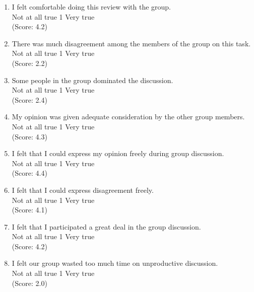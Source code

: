\begin{enumerate}
\item I felt comfortable doing this review with the group.
\\
Not at all true \hfill 1     \hfill Very true\\
(Score: 4.2)

\item There was much disagreement among the members of the group on
this task.
\\
Not at all true \hfill 1     \hfill Very true\\
(Score: 2.2)

\item Some people in the group dominated the discussion.
\\
Not at all true \hfill 1     \hfill Very true\\
(Score: 2.4)

\item My opinion was given adequate consideration by the other group members.
\\
Not at all true \hfill 1     \hfill Very true\\
(Score: 4.3)


\item I felt that I could express my opinion freely during group discussion. 
\\
Not at all true \hfill 1     \hfill Very true\\
(Score: 4.4)

\item I felt that I could express disagreement freely.
\\
Not at all true \hfill 1     \hfill Very true\\
(Score: 4.1)

\item I felt that I participated a great deal in the group discussion.
\\
Not at all true \hfill 1     \hfill Very true\\
(Score: 4.2)

\item I felt our group wasted too much time on unproductive
discussion.
\\
Not at all true \hfill 1     \hfill Very true\\
(Score: 2.0)


\end{enumerate}
